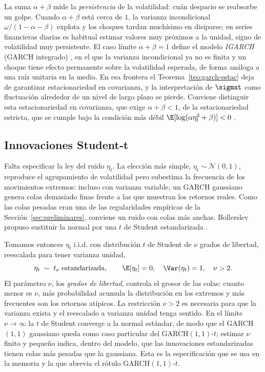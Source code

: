 La suma $\alpha + \beta$ mide la \emph{persistencia} de la volatilidad: cuán despacio se reabsorbe un golpe. Cuando $\alpha + \beta$ está cerca de $1$, la varianza incondicional $\omega/(1-\alpha-\beta)$ explota y los choques tardan muchísimo en disiparse; en series financieras diarias es habitual estimar valores muy próximos a la unidad, signo de volatilidad muy persistente. El caso límite $\alpha + \beta = 1$ define el modelo \emph{IGARCH} (GARCH integrado) \cite{englebollerslev1986}, en el que la varianza incondicional ya no es finita y un choque tiene efecto permanente sobre la volatilidad esperada, de forma análoga a una raíz unitaria en la media. En esa frontera el Teorema~\ref{teo:garch-estac} deja de garantizar estacionariedad en covarianza, y la interpretación de $\sigmat$ como fluctuación alrededor de un nivel de largo plazo se pierde. Conviene distinguir esta estacionariedad en covarianza, que exige $\alpha+\beta<1$, de la estacionariedad estricta, que se cumple bajo la condición más débil $\E[\log(\alpha \eta_t^2+\beta)]<0$ \cite{nelson1990}.

\subsection{Innovaciones Student-t}
\label{sec:garch-t}

Falta especificar la ley del ruido $\eta_t$. La elección más simple, $\eta_t \sim \mathcal{N}(0,1)$, reproduce el agrupamiento de volatilidad pero subestima la frecuencia de los movimientos extremos: incluso con varianza variable, un GARCH gaussiano genera colas demasiado finas frente a las que muestran los retornos reales. Como las colas pesadas eran una de las regularidades empíricas de la Sección~\ref{sec:preliminares}, conviene un ruido con colas más anchas. Bollerslev propuso sustituir la normal por una $t$ de Student estandarizada \cite{bollerslev1987}.

Tomamos entonces $\eta_t$ i.i.d. con distribución $t$ de Student de $\nu$ grados de libertad, reescalada para tener varianza unidad,
\[
\eta_t \;\sim\; t_\nu \;\text{estandarizada}, \qquad \E[\eta_t] = 0, \quad \Var(\eta_t) = 1, \quad \nu > 2.
\]
El parámetro $\nu$, los \emph{grados de libertad}, controla el grosor de las colas: cuanto menor es $\nu$, más probabilidad acumula la distribución en los extremos y más frecuentes son los retornos atípicos. La restricción $\nu > 2$ es necesaria para que la varianza exista y el reescalado a varianza unidad tenga sentido. En el límite $\nu \to \infty$ la $t$ de Student converge a la normal estándar, de modo que el GARCH$(1,1)$ gaussiano queda como caso particular del GARCH$(1,1)$-$t$; estimar $\nu$ finito y pequeño indica, dentro del modelo, que las innovaciones estandarizadas tienen colas más pesadas que la gaussiana. Esta es la especificación que se usa en la memoria y la que abrevia el rótulo GARCH$(1,1)$-$t$.


